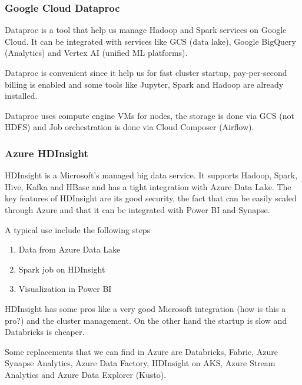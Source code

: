 \subsubsection{Google Cloud Dataproc}

Dataproc is a tool that help us manage Hadoop and Spark services on Google Cloud. It can be integrated with services like GCS (data lake), Google BigQuery (Analytics) and Vertex AI (unified ML platforms).

Dataproc is convenient since it help us for fast cluster startup, pay-per-second billing is enabled and some tools like Jupyter, Spark and Hadoop are already installed.

\vspace{10pt}

Dataproc uses compute engine VMs for nodes, the storage is done via GCS (not HDFS) and Job orchestration is done via Cloud Composer (Airflow).



\subsubsection{Azure HDInsight}

HDInsight is a Microsoft's managed big data service. It supports Hadoop, Spark, Hive, Kafka and HBase and has a tight integration with Azure Data Lake. The key features of HDInsight are its good security, the fact that can be easily scaled through Azure and that it can be integrated with Power BI and Synapse.

\vspace{10pt}

A typical use include the following steps

\begin{enumerate}
    \item Data from Azure Data Lake
    \item Spark job on HDInsight
    \item Visualization in Power BI
\end{enumerate}


HDInsight has some pros like a very good Microsoft integration (how is this a pro?) and the cluster management. On the other hand the startup is slow and Databricks is cheaper. 

Some replacements that we can find in Azure are Databricks, Fabric, Azure Synapse Analytics, Azure Data Factory, HDInsight on AKS, Azure Stream Analytics and Azure Data Explorer (Kusto).




